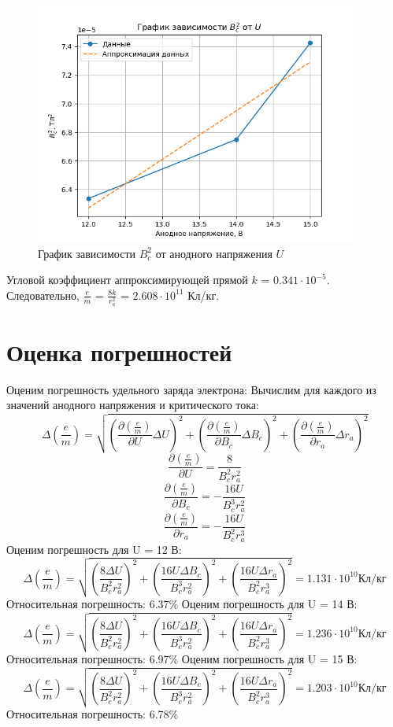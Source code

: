 \documentclass{article}%
\begin{document}
\begin{figure}[h!]%
\centering%
\includegraphics[width=400px]{Bc2_vs_U.png}%
\caption{График зависимости $B_c^2$ от анодного напряжения $U$}%
\end{figure}

%
 Угловой коэффициент аппроксимирующей прямой $k$ = $0.341 \cdot 10^{-5}$.%
 \\ \vspace{1cm} Следовательно, $\frac{e}{m}$ = $\frac{8 k}{r_a^2}$ =  $2.608 \cdot 10^{11}$ Кл/кг.%
\section{Оценка погрешностей}%
\label{sec:}%
Оценим погрешность удельного заряда электрона: %
 Вычислим для каждого из значений анодного напряжения и критического тока:%
$$\Delta \left( \frac{e}{m} \right) = \sqrt{ \left( \frac{\partial \left( \frac{e}{m} \right)}{\partial U} \Delta U \right)^2 + \left( \frac{\partial \left( \frac{e}{m} \right)}{\partial B_c} \Delta B_c \right)^2 + \left( \frac{\partial \left( \frac{e}{m} \right)}{\partial r_a} \Delta r_a \right)^2 }$$%
$$\frac{\partial \left( \frac{e}{m} \right)}{\partial U} = \frac{8}{B_c^2 r_a^2}$$%
$$\frac{\partial \left( \frac{e}{m} \right)}{\partial B_c} = -\frac{16U}{B_c^3 r_a^2}$$%
$$\frac{\partial \left( \frac{e}{m} \right)}{\partial r_a} = -\frac{16U}{B_c^2 r_a^3}$$%
Оценим погрешность для U = 12 В: %
$$\Delta \left( \frac{e}{m} \right) = \sqrt{ \left( \frac{8 \Delta U}{B_c^2 r_a^2} \right)^2 + \left( \frac{16U \Delta B_c}{B_c^3 r_a^2} \right)^2 + \left( \frac{16U \Delta r_a}{B_c^2 r_a^3} \right)^2 } = \text{$1.131 \cdot 10^{10}$} \text{Кл/кг}$$%
Относительная погрешность: 6.37\%%
\newline%
Оценим погрешность для U = 14 В: %
$$\Delta \left( \frac{e}{m} \right) = \sqrt{ \left( \frac{8 \Delta U}{B_c^2 r_a^2} \right)^2 + \left( \frac{16U \Delta B_c}{B_c^3 r_a^2} \right)^2 + \left( \frac{16U \Delta r_a}{B_c^2 r_a^3} \right)^2 } = \text{$1.236 \cdot 10^{10}$} \text{Кл/кг}$$%
Относительная погрешность: 6.97\%%
\newline%
Оценим погрешность для U = 15 В: %
$$\Delta \left( \frac{e}{m} \right) = \sqrt{ \left( \frac{8 \Delta U}{B_c^2 r_a^2} \right)^2 + \left( \frac{16U \Delta B_c}{B_c^3 r_a^2} \right)^2 + \left( \frac{16U \Delta r_a}{B_c^2 r_a^3} \right)^2 } = \text{$1.203 \cdot 10^{10}$} \text{Кл/кг}$$%
Относительная погрешность: 6.78\%%
\newline
\end{document}
